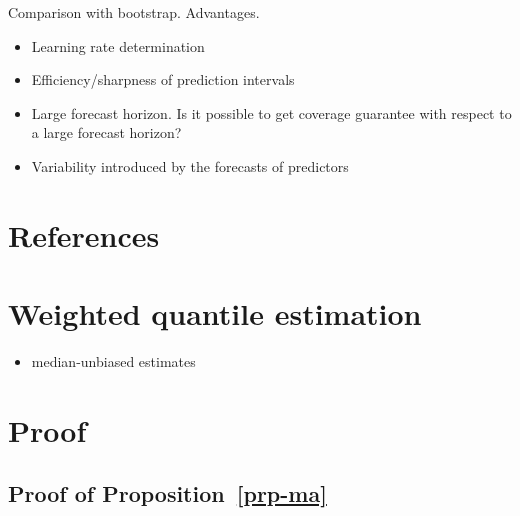 \documentclass[
  11pt,
  a4paper,
]{article}
\providecommand{\tightlist}{%
  \setlength{\itemsep}{0pt}\setlength{\parskip}{0pt}}\usepackage{longtable,booktabs,array}
\theoremstyle{plain}
\theoremstyle{remark}
\begin{document}
Comparison with bootstrap. Advantages.

\begin{itemize}
\item
  Learning rate determination
\item
  Efficiency/sharpness of prediction intervals
\item
  Large forecast horizon. Is it possible to get coverage guarantee with
  respect to a large forecast horizon?
\item
  Variability introduced by the forecasts of predictors
\end{itemize}

\section*{References}\label{references}

\printbibliography[heading=none]

\newpage
\appendix
\setcounter{section}{0}
\renewcommand{\thesection}{Appendix \Alph{section}}
\renewcommand{\thesubsection}{\Alph{section}.\arabic{subsection}}
\renewcommand{\thefigure}{A\arabic{figure}}
\renewcommand{\thetable}{A\arabic{table}}
\setcounter{figure}{0}
\setcounter{table}{0}

\section{Weighted quantile estimation}\label{appendix-wq}

\begin{itemize}
\tightlist
\item
  median-unbiased estimates
\end{itemize}

\section{Proof}\label{sec-proof}

\subsection{\texorpdfstring{Proof of
Proposition~\ref{prp-ma}}{Proof of Proposition~}}\label{sec-proof_ma}
\end{document}
